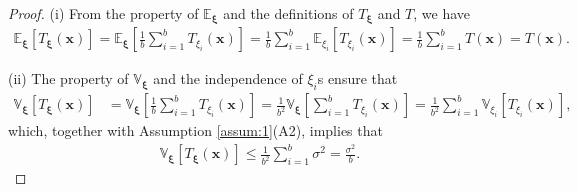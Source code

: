 \documentclass[smallextended,referee,envcountsect,]{svjour3}
\begin{document}
\begin{proof}
(i) From the property of $\mathbb{E}_{\bm{\xi}}$ and the definitions of $T_{\bm{\xi}}$ and $T$, we have 
\begin{align*}
\mathbb{E}_{\bm{\xi}}[T_{\bm{\xi}}(\bm{x})]
= 
\mathbb{E}_{\bm{\xi}} \left[
\frac{1}{b} \sum_{i=1}^b T_{\xi_{i}}(\bm{x})
\right]
= 
\frac{1}{b} \sum_{i=1}^b \mathbb{E}_{\xi_i} [T_{\xi_{i}}(\bm{x})]
= \frac{1}{b} \sum_{i=1}^b T (\bm{x})
= T (\bm{x}).
\end{align*}

(ii) The property of $\mathbb{V}_{\bm{\xi}}$ and the independence of $\xi_i$s ensure that
\begin{align*}
\mathbb{V}_{\bm{\xi}}[T_{\bm{\xi}} (\bm{x})]
&= 
\mathbb{V}_{\bm{\xi}} \left[
\frac{1}{b} \sum_{i=1}^b T_{\xi_{i}}(\bm{x}) 
\right]
= 
\frac{1}{b^{2}}
\mathbb{V}_{\bm{\xi}} \left[
\sum_{i=1}^b T_{\xi_{i}}(\bm{x})
\right]
= 
\frac{1}{b^{2}}
\sum_{i=1}^b
\mathbb{V}_{\xi_i} \left[
T_{\xi_{i}}(\bm{x})
\right],
\end{align*}
which, together with Assumption \ref{assum:1}(A2), implies that
\begin{align*}
\mathbb{V}_{\bm{\xi}}[T_{\bm{\xi}} (\bm{x})]
\leq 
\frac{1}{b^{2}}
\sum_{i=1}^b \sigma^2
= \frac{\sigma^2}{b}.
\end{align*}


\end{proof}
\end{document}
